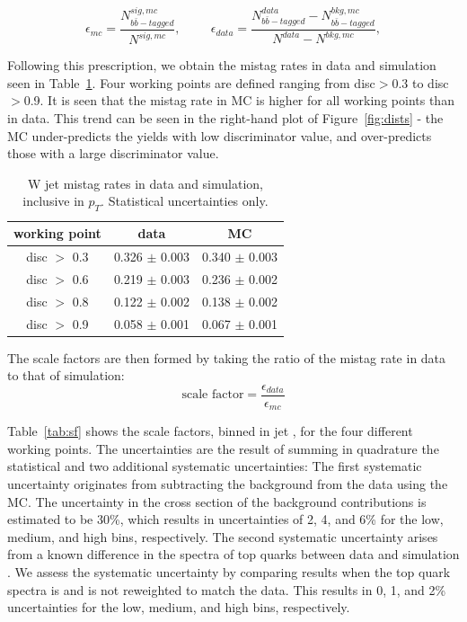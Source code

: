 \begin{equation}
\label{eq:mistags}
\epsilon_{mc} = \frac{ N_{b\bar{b}-tagged}^{sig, mc} } { N^{sig, mc} }, \hspace{1cm}
\epsilon_{data} = \frac{N_{b\bar{b}-tagged}^{data}-N_{b\bar{b}-tagged}^{bkg, mc}}{N^{data} - N^{bkg, mc}}, 
\end{equation}

Following this prescription, we obtain the mistag rates in data and simulation seen in Table~\ref{tab:mistag}. Four working points are defined ranging from disc$>$0.3 to disc$>$0.9. It is seen that the mistag rate in MC is higher for all working points than in data. This trend can be seen in the right-hand plot of Figure~\ref{fig:dists} - the MC under-predicts the yields with low discriminator value, and over-predicts those with a large discriminator value.

\begin{table}
\centering
\caption[W jet \bbbar mistag rates in data and simulation, inclusive in \pt.]{W jet \bbbar mistag rates in data and simulation, inclusive in $p_{T}$. Statistical uncertainties only.}
\label{tab:mistag}
\begin{tabular}{c|cc}
\hline\hline
working point & data & MC\\
\hline
disc $>$ 0.3 & 0.326 $\pm$ 0.003 & 0.340 $\pm$ 0.003 \\
disc $>$ 0.6 & 0.219 $\pm$ 0.003 & 0.236 $\pm$ 0.002 \\
disc $>$ 0.8 & 0.122 $\pm$ 0.002 & 0.138 $\pm$ 0.002 \\
disc $>$ 0.9 & 0.058 $\pm$ 0.001 & 0.067 $\pm$ 0.001 \\
\hline\hline
\end{tabular}
\end{table}

The scale factors are then formed by taking the ratio of the mistag rate in data to that of simulation:
\begin{equation}
\label{eq:sf}
\textrm{scale factor} = \frac{\epsilon_{data}} {\epsilon_{mc}}
\end{equation}

Table~\ref{tab:sf} shows the scale factors, binned in jet \pt, for the four different working points. The uncertainties are the result of summing in quadrature the statistical and two additional systematic uncertainties: The first systematic uncertainty originates from subtracting the background from the data using the MC. The uncertainty in the cross section of the background contributions is estimated to be 30\%, which results in uncertainties of 2, 4, and 6\% for the low, medium, and high \pt bins, respectively.  The second systematic uncertainty arises from a known difference in the \pt spectra of top quarks between data and simulation \cite{ttbar}. We assess the systematic uncertainty by comparing results when the top quark \pt spectra is and is not reweighted to match the data.  This results in 0, 1, and 2\% uncertainties for the low, medium, and high \pt bins, respectively.

